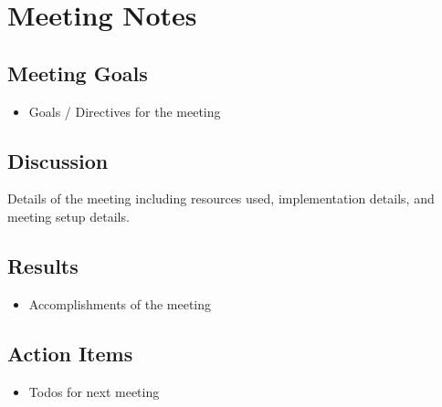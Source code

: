 \section{Meeting Notes}

\subsection{Meeting Goals}
\begin{itemize}
    \item Goals / Directives for the meeting
\end{itemize}

\subsection{Discussion}
Details of the meeting including resources used, implementation details, and meeting setup details.

\subsection{Results}
\begin{itemize}
    \item Accomplishments of the meeting
\end{itemize}

\subsection{Action Items}
\begin{itemize}
    \item Todos for next meeting
\end{itemize}